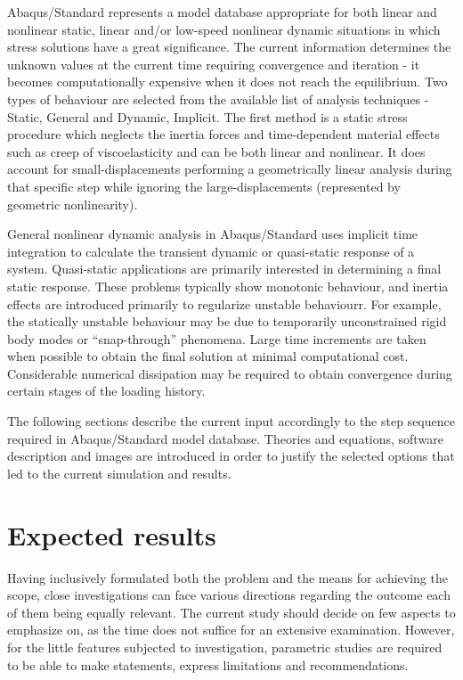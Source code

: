 \documentclass[12pt,a4paper]{report}
\begin{document}
Abaqus/Standard represents a model database appropriate for both linear and nonlinear static, linear and/or low-speed nonlinear dynamic situations in which stress solutions have a great significance. The current information determines the unknown values at the current time requiring convergence and iteration - it becomes computationally expensive when it does not reach the equilibrium. Two types of behaviour are selected from the available list of analysis techniques - Static, General and Dynamic, Implicit. The first method is a static stress procedure which neglects the inertia forces and time-dependent material effects such as creep of viscoelasticity and can be both linear and nonlinear. It does account for small-displacements performing a geometrically linear analysis during that specific step while ignoring the large-displacements (represented by geometric nonlinearity).

General nonlinear dynamic analysis in Abaqus/Standard uses implicit time integration to calculate the transient dynamic or quasi-static response of a system. Quasi-static applications are primarily interested in determining a final static response. These problems typically show monotonic behaviour, and inertia effects are introduced primarily to regularize unstable behaviourr. For example, the statically unstable behaviour may be due to temporarily unconstrained rigid body modes or “snap-through” phenomena. Large time increments are taken when possible to obtain the final solution at minimal computational cost. Considerable numerical dissipation may be required to obtain convergence during certain stages of the loading history.

The following sections describe the current input accordingly to the step sequence required in Abaqus/Standard model database. Theories and equations, software description and images are introduced in order to justify the selected options that led to the current simulation and results.
\section{Expected results}
Having inclusively formulated both the problem and the means for achieving the scope, close investigations can face various directions regarding the outcome each of them being equally relevant. The current study should decide on few aspects to emphasize on, as the time does not suffice for an extensive examination. However, for the little features subjected to investigation, parametric studies are required to be able to make statements, express limitations and recommendations.
\end{document}
